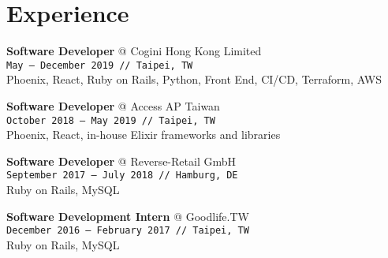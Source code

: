 \documentclass[10pt,a4paper]{article}
\makeatletter
\newcommand{\experience}[4]{\par\vspace{1em}\textbf{\normalsize #1} {\color{darkgray} @ #2}\\{\footnotesize\texttt{#3 // #4}}\\[4pt]}
\makeatother
\begin{document}
\begin{minipage}[t]{0.67\textwidth}
  \vspace{1.2em}
  \section{Experience}
  \vspace*{-6pt}

  \experience{Software Developer}{Cogini Hong Kong Limited}{May {–} December 2019}{Taipei, TW}

  \small Phoenix, React, Ruby on Rails, Python, Front End, CI/CD, Terraform, AWS

  \experience{Software Developer}{Access AP Taiwan}{October 2018 {–} May 2019}{Taipei, TW}

  \small Phoenix, React, in-house Elixir frameworks and libraries

  \experience{Software Developer}{Reverse-Retail GmbH}{September 2017 {–} July 2018}{Hamburg, DE}

  \small Ruby on Rails, MySQL

  \experience{Software Development Intern}{Goodlife.TW}{December 2016 {–} February 2017}{Taipei, TW}

  \small Ruby on Rails, MySQL

\end{minipage}\hspace{0.03\textwidth}%
\end{document}
